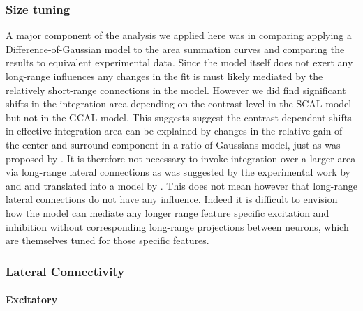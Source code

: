 \subsubsection{Size tuning}

A major component of the analysis we applied here was in comparing
applying a Difference-of-Gaussian model to the area summation curves
and comparing the results to equivalent experimental data. Since the
model itself does not exert any long-range influences any changes in
the fit is must likely mediated by the relatively short-range
connections in the model. However we did find significant shifts in
the integration area depending on the contrast level in the SCAL model
but not in the GCAL model. This suggests suggest the 
contrast-dependent shifts in effective integration area can be explained by
changes in the relative gain of the center and surround component in a
ratio-of-Gaussians model, just as was proposed by
\cite{Cavanaugh2002}. It is therefore not necessary to invoke
integration over a larger area via long-range lateral connections as
was suggested by the experimental work by \cite{Levitt2002} and
\cite{Sceniak2001} and translated into a model by
\cite{Schwabe2006}. This does not mean however that long-range lateral
connections do not have any influence. Indeed it is difficult to
envision how the model can mediate any longer range feature specific
excitation and inhibition without corresponding long-range projections
between neurons, which are themselves tuned for those specific
features.

\subsubsection{Lateral Connectivity}

\paragraph{Excitatory}

